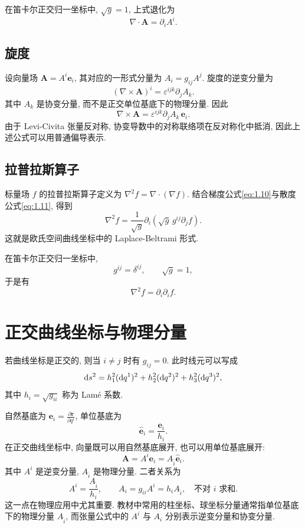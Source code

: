 在笛卡尔正交归一坐标中, $\sqrt{g}=1$, 上式退化为
\[
\nabla\cdot\bm{A}
=
\partial_{i} A^{i}.
\]

\subsection{旋度}

设向量场 $\bm{A}=A^{i}\bm{e}_{i}$, 其对应的一形式分量为 $A_{i}=g_{ij}A^{j}$. 旋度的逆变分量为
\begin{equation}
(\nabla\times\bm{A})^{i}
=
\varepsilon^{ijk}\partial_{j} A_{k}. \label{eq:1.12}
\end{equation}
其中 $A_{k}$ 是协变分量, 而不是正交单位基底下的物理分量. 因此
\[
\nabla\times\bm{A}
=
\varepsilon^{ijk}\partial_{j} A_{k}\,\bm{e}_{i}.
\]
由于 Levi-Civita 张量反对称, 协变导数中的对称联络项在反对称化中抵消, 因此上述公式可以用普通偏导表示. 

\subsection{拉普拉斯算子}

标量场 $f$ 的拉普拉斯算子定义为 $\nabla^{2} f = \nabla\cdot(\nabla f)$. 结合梯度公式\eqref{eq:1.10}与散度公式\eqref{eq:1.11}, 得到
\begin{equation}
\nabla^{2} f
=
\frac{1}{\sqrt{g}}
\partial_{i}
\left(
\sqrt{g}\,g^{ij}\partial_{j} f
\right). \label{eq:1.13}
\end{equation}
这就是欧氏空间曲线坐标中的 Laplace-Beltrami 形式. 

在笛卡尔正交归一坐标中, 
\[
g^{ij}=\delta^{ij},
\qquad
\sqrt{g}=1,
\]
于是有
\[
\nabla^{2} f
=
\partial_{i}\partial_{i} f.
\]

\section{正交曲线坐标与物理分量}

若曲线坐标是正交的, 则当 $i\neq j$ 时有 $g_{ij}=0$. 此时线元可以写成
\begin{equation}
\mathop{}\!\mathrm{d} s^{2}
=
h_{1}^{2}(\mathop{}\!\mathrm{d} q^{1})^{2}
+
h_{2}^{2}(\mathop{}\!\mathrm{d} q^{2})^{2}
+
h_{3}^{2}(\mathop{}\!\mathrm{d} q^{3})^{2}, \label{eq:1.14}
\end{equation}
其中 $h_{i}=\sqrt{g_{ii}}$ 称为 Lamé 系数. 

自然基底为 $\bm{e}_{i} = \frac{\partial\bm{r}}{\partial q^{i}}$, 单位基底为
\[
\hat{\bm{e}}_{i}
=
\frac{\bm{e}_{i}}{h_{i}}.
\]
在正交曲线坐标中, 向量既可以用自然基底展开, 也可以用单位基底展开: 
\[
\bm{A}
=
A^{i}\bm{e}_{i}
=
A_{\hat{i}}\hat{\bm{e}}_{i}.
\]
其中 $A^{i}$ 是逆变分量, $A_{\hat{i}}$ 是物理分量. 二者关系为
\begin{equation}
A^{i}=\frac{A_{\hat{i}}}{h_{i}},
\qquad
A_{i}=g_{ii}A^{i}=h_{i}A_{\hat{i}},
\quad \text{不对 $i$ 求和}. \label{eq:1.15}
\end{equation}
这一点在物理应用中尤其重要. 教材中常用的柱坐标、球坐标分量通常指单位基底下的物理分量 $A_{\hat{i}}$, 而张量公式中的 $A^{i}$ 与 $A_{i}$ 分别表示逆变分量和协变分量. 

